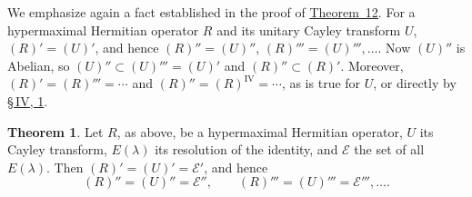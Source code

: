\documentclass[
  paper=b5,
  twoside=true,
  fontsize=13pt,
  headings=normal,
  bookmarkpackage=false
]{scrartcl}
\theoremstyle{definition}
\newtheorem{theorem}{Theorem}
\newcommand{\TheoremRef}[1]{\hyperref[thm:#1]{Theorem~#1}}
\begin{document}
We emphasize again a fact established in the proof of \TheoremRef{12}.
For a hypermaximal Hermitian operator \(R\) and its unitary Cayley
transform \(U\), \((R)'=(U)'\), and hence \((R)''=(U)''\),
\((R)'''=(U)''',\ldots\). Now \((U)''\) is Abelian, so
\((U)''\subset(U)'''=(U)'\) and \((R)''\subset(R)'\). Moreover,
\((R)'=(R)'''=\cdots\) and \((R)''=(R)^{\mathrm{IV}}=\cdots\),
as is true for \(U\), or directly by \hyperref[sec:iv-1]{\S\,IV, 1}.

\begin{theorem}\label{thm:13}
Let \(R\), as above, be a hypermaximal Hermitian operator, \(U\) its
Cayley transform, \(E(\lambda)\) its resolution of the identity, and
\(\mathcal E\) the set of all \(E(\lambda)\). Then
\((R)'=(U)'=\mathcal E'\), and hence
\[
  (R)''=(U)''=\mathcal E'',\qquad
  (R)'''=(U)'''=\mathcal E''',\ldots.
\]
\end{theorem}
\end{document}
